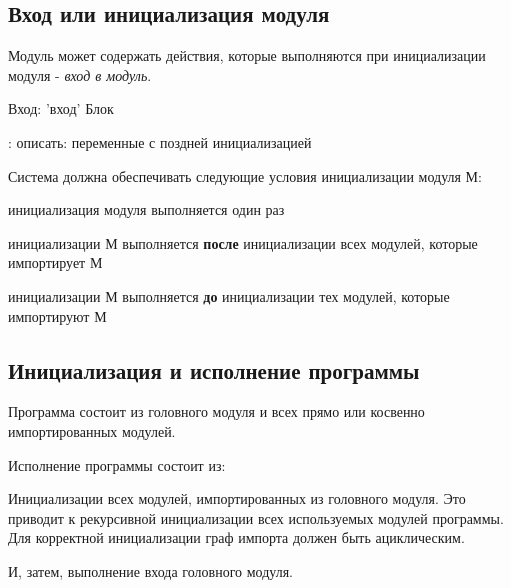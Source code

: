 \hypertarget{entry}{%
\subsection{Вход или инициализация модуля}\label{mods:entry}}

Модуль может содержать действия, которые выполняются при инициализации модуля - \emph{вход в модуль}. 

\begin{Trivil}
Вход: 'вход' Блок
\end{Trivil}

\TBD: описать: переменные с поздней инициализацией
\bigskip

Система должна обеспечивать следующие условия инициализации модуля М:
\begin{d_itemize}
\item
    инициализация модуля выполняется один раз
\item
    инициализации М выполняется \textbf{после} инициализации всех модулей, которые импортирует М
\item
    инициализации М выполняется \textbf{до} инициализации тех модулей, которые импортируют М
\end{d_itemize}

\hypertarget{execution}{%
\subsection{Инициализация и исполнение программы}\label{mods:execution}}

Программа состоит из головного модуля и всех прямо или косвенно импортированных модулей.

Исполнение программы состоит из:
\begin{d_itemize}
\item
    Инициализации всех модулей, импортированных из головного модуля. Это приводит к рекурсивной инициализации всех используемых модулей
    программы. Для корректной инициализации граф импорта должен быть ациклическим.
\item
    И, затем, выполнение входа головного модуля.
\end{d_itemize}

